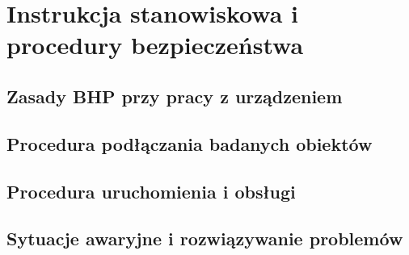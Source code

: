 \chapter{Instrukcja stanowiskowa i procedury bezpieczeństwa}
\label{chap:instrukcja}

\section{Zasady BHP przy pracy z urządzeniem}

\section{Procedura podłączania badanych obiektów}

\section{Procedura uruchomienia i obsługi}

\section{Sytuacje awaryjne i rozwiązywanie problemów}
